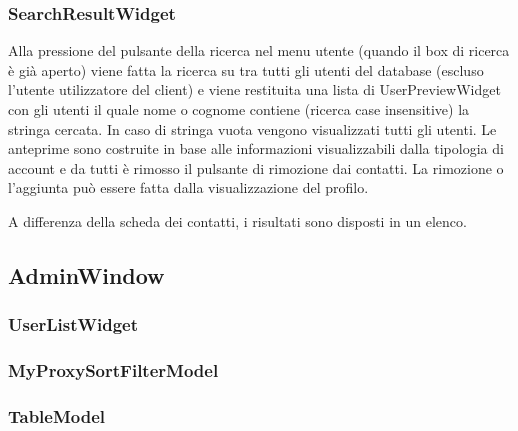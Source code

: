 \documentclass[a4paper]{article}
\begin{document}
\subsubsection*{SearchResultWidget}
Alla pressione del pulsante della ricerca nel menu utente (quando il box di ricerca è già aperto) viene fatta la ricerca su tra tutti gli utenti del database (escluso l'utente utilizzatore del client) e viene restituita una lista di UserPreviewWidget con gli utenti il quale nome o cognome contiene (ricerca case insensitive) la stringa cercata. In caso di stringa vuota vengono visualizzati tutti gli utenti. Le anteprime sono costruite in base alle informazioni visualizzabili dalla tipologia di account e da tutti è rimosso il pulsante di rimozione dai contatti. La rimozione o l'aggiunta può essere fatta dalla visualizzazione del profilo.

A differenza della scheda dei contatti, i risultati sono disposti in un elenco.

\subsection*{AdminWindow}


\subsubsection*{UserListWidget}

\subsubsection*{MyProxySortFilterModel}

\subsubsection*{TableModel}
\end{document}

